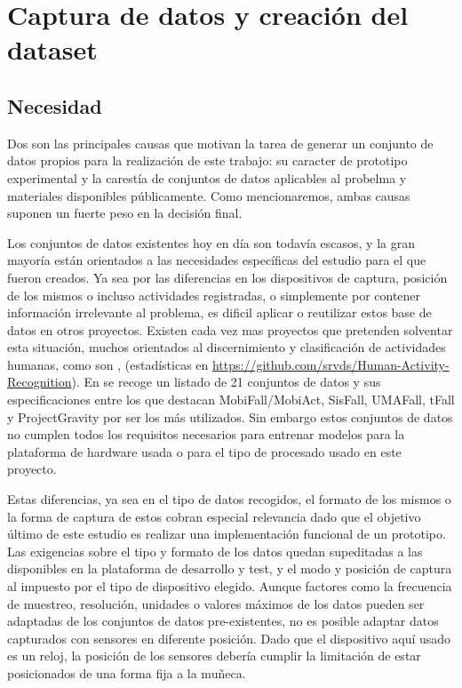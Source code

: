 \documentclass[../tfm.tex]{subfiles}
\begin{document}
\section{Captura de datos y creación del dataset}

\subsection{Necesidad}

Dos son las principales causas que motivan la tarea de generar un conjunto de datos propios para la realización de este trabajo: su caracter de prototipo experimental y la carestía de conjuntos de datos aplicables al probelma y materiales disponibles públicamente. Como mencionaremos, ambas causas suponen un fuerte peso en la decisión final.


Los conjuntos de datos existentes hoy en día son todavía escasos, y la gran mayoría están orientados a las necesidades específicas del estudio para el que fueron creados. Ya sea por las diferencias en los dispositivos de captura, posición de los mismos o incluso actividades registradas, o simplemente por contener información irrelevante al problema, es dificil aplicar o reutilizar estos base de datos en otros proyectos. Existen cada vez mas proyectos que pretenden solventar esta situación, muchos orientados al discernimiento y clasificación de actividades humanas, como son \cite{Anguita2013,ReyesOrtiz2014}, (estadísticas en \url{https://github.com/srvds/Human-Activity-Recognition}). En \cite{Casilari2020} se recoge un listado de 21 conjuntos de datos y sus especificaciones entre los que destacan MobiFall\cite{MobiFall}/MobiAct\cite{MobiAct}, SisFall\cite{Sucerquia2017}, UMAFall\cite{EduUMA2017}, tFall\cite{tfall} y ProjectGravity\cite{Vilarinho2015} por ser los más utilizados. Sin embargo estos conjuntos de datos no cumplen todos los requisitos necesarios para entrenar modelos para la plataforma de hardware usada o para el tipo de procesado usado en este proyecto.

Estas diferencias, ya sea en el tipo de datos recogidos, el formato de los mismos o la forma de captura de estos cobran especial relevancia dado que el objetivo último de este estudio es realizar una implementación funcional de un prototipo. Las exigencias sobre el tipo y formato de los datos quedan supeditadas a las disponibles en la plataforma de desarrollo y test, y el modo y posición de captura al impuesto por el tipo de dispositivo elegido. Aunque factores como la frecuencia de muestreo, resolución, unidades o valores máximos de los datos pueden ser adaptadas de los conjuntos de datos pre-existentes, no es posible adaptar datos capturados con sensores en diferente posición. Dado que el dispositivo aquí usado es un reloj, la posición de los sensores debería cumplir la limitación de estar posicionados de una forma fija a la muñeca.
\end{document}
